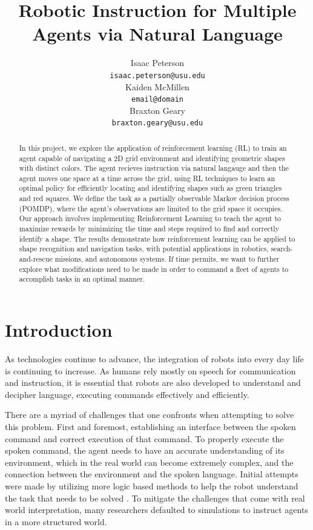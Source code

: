 \documentclass[11pt]{article}
\title{Robotic Instruction for Multiple Agents via Natural Language}
\author{Isaac Peterson \\
  \texttt{isaac.peterson@usu.edu} \\\And
  Kaiden McMillen \\
  \texttt{email@domain} \\\And 
  Braxton Geary \\
  \texttt{braxton.geary@usu.edu} 
  }
\begin{document}
\maketitle
\begin{abstract}
  In this project, we explore the application of reinforcement learning (RL) to train an agent capable of navigating a 2D grid environment and identifying geometric shapes with distinct colors. The agent recieves instruction via natural langauge and then the agent moves one space at a time across the grid, using RL techniques to learn an optimal policy for efficiently locating and identifying shapes such as green triangles and red squares. We define the task as a partially observable Markov decision process (POMDP), where the agent's observations are limited to the grid space it occupies. Our approach involves implementing Reinforcement Learning to teach the agent to maximize rewards by minimizing the time and steps required to find and correctly identify a shape. The results demonstrate how reinforcement learning can be applied to shape recognition and navigation tasks, with potential applications in robotics, search-and-rescue missions, and autonomous systems. If time permits, we want to further explore what modifications need to be made in order to command a fleet of agents to accomplish tasks in an optimal manner.

\end{abstract}

\section{Introduction}
As technologies continue to advance, the integration of robots into every day life is continuing to increase. As humans rely mostly on speech for communication and instruction, it is essential that robots are also developed to understand and decipher language, executing commands effectively and efficiently. 

There are a myriad of challenges that one confronts when attempting to solve this problem. First and foremost, establishing an interface between the spoken command and correct execution of that command. To properly execute the spoken command, the agent needs to have an accurate understanding of its environment, which in the real world can become extremely complex, and the connection between the environment and the spoken language. Initial attempts were made by utilizing more logic based methods to help the robot understand the task that needs to be solved \cite{Liu2016}. To mitigate the challenges that come with real world interpretation, many researchers defaulted to simulations to instruct agents in a more structured world.
\end{document}
